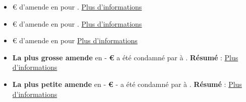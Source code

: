 \documentclass[french]{article}
\begin{document}
\newpage
\justify
	\begin{multicols}{2}
		\begin{itemize}
			\item \textbf{} \newline
			€ d'amende en  pour .
			\newline
			\newline
			\href{\VAR{new1_link}}{Plus d'informations}
			\vspace{1cm}
	
			\item \textbf{} \newline
			€ d'amende en  pour .
			\newline
			\newline
			\href{\VAR{new2_link}}{Plus d'informations}
			\vspace{1cm}
	
			\item \textbf{} \newline {}€ d'amende en  pour 
			\newline
			\newline
			\href{\VAR{new3_link}}{Plus d'informations}
		\end{itemize}
	\end{multicols}

\newpage
\justify
	\begin{multicols}{2}
		\begin{itemize}
			\item \textbf{La plus grosse amende} en  - \textbf{ €} a été condamné par  à .
			\newline
			\textbf{Résumé} : 
			\newline
			\href{\VAR{largest_fine_link}}{Plus d'informations}
			\vspace{1cm}
		
			\item \textbf{La plus petite amende} en  - \textbf{ €} -  a été condamné par  à .
			\newline
			\textbf{Résumé} : 
			\newline
			\href{\VAR{lowest_fine_link}}{Plus d'informations}
		\end{itemize}
	\end{multicols}
\end{document}
